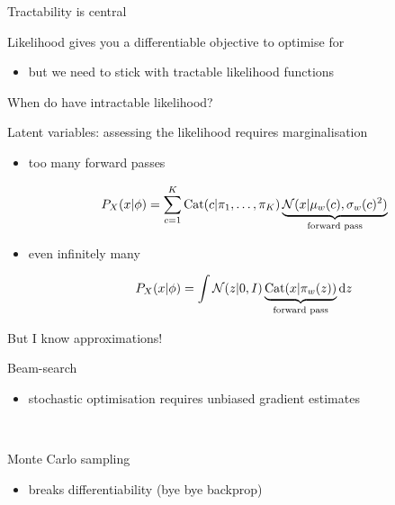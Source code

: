 \documentclass[14pt]{beamer}
\begin{document}
\begin{frame}{Tractability is central}

Likelihood gives you a differentiable objective to optimise for
\begin{itemize}
	\item but we need to stick with \alert{tractable} likelihood functions
\end{itemize}




\end{frame}

\begin{frame}{When do have intractable likelihood?}

Latent variables: assessing the likelihood requires marginalisation
\begin{itemize}
	\item too many forward passes
	\begin{small}
	\begin{equation*}
	P_X(x|\phi) = \sum_{c=1}^K \operatorname{Cat}(c|\pi_1, \ldots, \pi_K) \underbrace{\mathcal N(x|\mu_w(c), \sigma_w(c)^2)}_{\text{forward pass}}
	\end{equation*}
	\end{small}
	\item even infinitely many
	\begin{small}
	\begin{equation*}
	P_X(x|\phi) = \int \mathcal N(z|0, I) \underbrace{\operatorname{Cat}(x|\pi_w(z))}_{\text{forward pass}} \mathrm{d}z
	\end{equation*}
	\end{small}
\end{itemize}

\end{frame}


\begin{frame}{But I know approximations!}

Beam-search %
\begin{itemize}
	\item stochastic optimisation requires \alert{unbiased gradient estimates}
\end{itemize}

~

Monte Carlo sampling
\begin{itemize}
	\item \alert{breaks differentiability} (bye bye backprop)
\end{itemize}

\end{frame}
\end{document}
